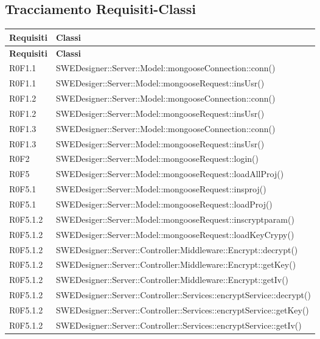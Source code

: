 	\newpage
	
	\subsection{Tracciamento Requisiti-Classi}
	\begin{center}
\begin{longtable}{p{2cm}!{\VRule[1pt]}p{13cm}}
\color{white} \textbf{Requisiti} & \color{white} \textbf{Classi}\\ 
\endfirsthead 
{} 
\color{white} \textbf{Requisiti} & \color{white} \textbf{Classi}\\  
\endhead 

R0F1.1 & SWEDesigner::Server::Model::mongooseConnection::conn()\\
R0F1.1 & SWEDesiger::Server::Model::mongooseRequest::insUsr()\\
R0F1.2 & SWEDesigner::Server::Model::mongooseConnection::conn()\\
R0F1.2 & SWEDesiger::Server::Model::mongooseRequest::insUsr()\\
R0F1.3 & SWEDesigner::Server::Model::mongooseConnection::conn()\\
R0F1.3 & SWEDesiger::Server::Model::mongooseRequest::insUsr()\\
R0F2 & SWEDesiger::Server::Model::mongooseRequest::login()\\
R0F5 & SWEDesiger::Server::Model::mongooseRequest::loadAllProj()\\
R0F5.1 & SWEDesiger::Server::Model::mongooseRequest::insproj()\\
R0F5.1 & SWEDesiger::Server::Model::mongooseRequest::loadProj()\\
R0F5.1.2 & SWEDesiger::Server::Model::mongooseRequest::inscryptparam()\\
R0F5.1.2 & SWEDesiger::Server::Model::mongooseRequest::loadKeyCrypy()\\
R0F5.1.2 & SWEDesigner::Server::Controller:Middleware::Encrypt::decrypt()\\
R0F5.1.2 & SWEDesigner::Server::Controller:Middleware::Encrypt::getKey()\\
R0F5.1.2 & SWEDesigner::Server::Controller:Middleware::Encrypt::getIv()\\
R0F5.1.2 & SWEDesigner::Server::Controller::Services::encryptService::decrypt()\\
R0F5.1.2 & SWEDesigner::Server::Controller::Services::encryptService::getKey()\\
R0F5.1.2 & SWEDesigner::Server::Controller::Services::encryptService::getIv()\\

\end{longtable}
\end{center}

